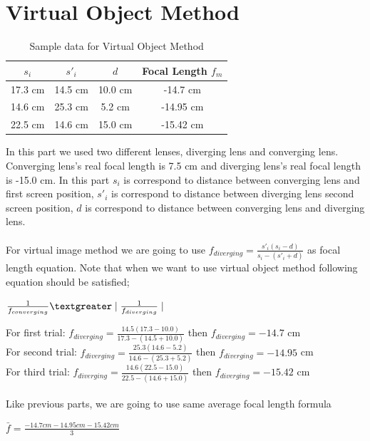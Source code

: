 \documentclass[a4paper,12pt]{report}
\begin{document}
\section{Virtual Object Method}
\begin{table}[h]
\begin{center}
	\begin{tabular}{|c|c|c|c|}
	\hline $s_{i}$ & $s'_{i}$ & $d$ & Focal Length $f_{m}$ \\ 
	\hline 17.3 cm & 14.5 cm & 10.0 cm & -14.7 cm \\ 
	\hline 14.6 cm & 25.3 cm & 5.2 cm & -14.95 cm \\ 
	\hline 22.5 cm & 14.6 cm & 15.0 cm & -15.42 cm \\ 
	\hline 
\end{tabular} 
\end{center}
\caption{Sample data for Virtual Object Method}
\end{table}
In this part we used two different lenses, diverging lens and converging lens. Converging lens's real focal length is 7.5 cm and diverging lens's real focal length is -15.0 cm. In this part $s_{i}$ is correspond to distance between converging lens and first screen position, $s'_{i}$ is correspond to distance between diverging lens second screen position, $d$ is correspond to distance between converging lens and diverging lens.\\\\
For virtual image method we are going to use $f_{diverging}=\frac{s'_{i}(s_{i}-d)}{s_{i}-(s'_{i}+d)}$ as focal length equation. Note that when we want to use virtual object method following equation should be satisfied;
\begin{center}
	$\frac{1}{f_{converging}}\textgreater \mid \frac{1}{f_{diverging}}\mid$
\end{center}
For first trial: $f_{diverging}=\frac{14.5(17.3-10.0)}{17.3-(14.5+10.0)}$ then $f_{diverging}=-14.7$ cm\\
For second trial: $f_{diverging}=\frac{25.3(14.6-5.2)}{14.6-(25.3+5.2)}$ then $f_{diverging}=-14.95$ cm\\
For third trial: $f_{diverging}=\frac{14.6(22.5-15.0)}{22.5-(14.6+15.0)}$ then $f_{diverging}=-15.42$ cm\\\\
Like previous parts, we are going to use same average focal length formula
\begin{center}
	$\bar{f}=\frac{-14.7 cm-14.95cm-15.42cm}{3}$\\
\end{center}
\end{document}
